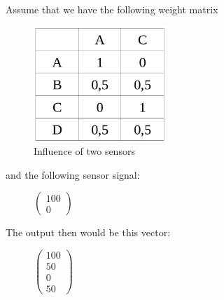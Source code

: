 Assume that we have the following weight matrix
\begin{figure}[h]
	\begin{center}
		\includegraphics[width=5cm]{figures/weights.png}
		\caption{Influence of two sensors}
	\end{center}
\end{figure}

and the following sensor signal:
\begin{figure}[ht]
	\centering
	$\begin{pmatrix}
	100 \\ 0
	\end{pmatrix}$
\end{figure}


The output then would be this vector:
\begin{figure}[ht]
	\centering
	$
	\begin{pmatrix} 100 \\ 50 \\ 0 \\ 50 \end{pmatrix}
	$
\end{figure}

\clearpage


\clearpage


  

